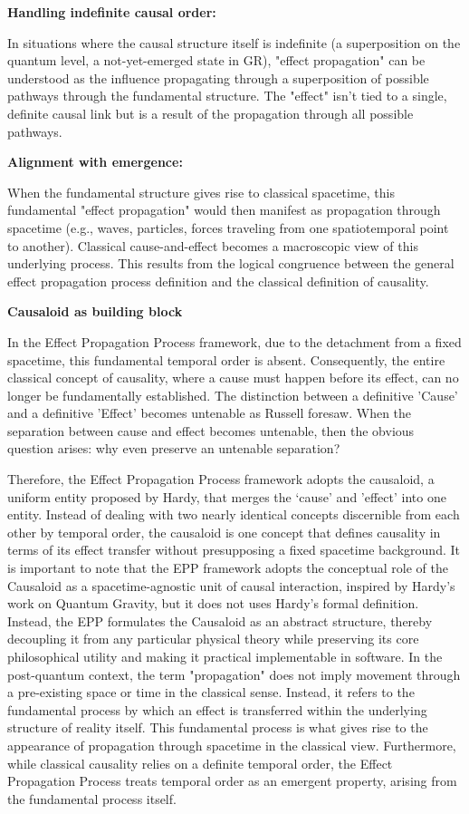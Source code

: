 \documentclass{article}
\begin{document}
\textbf{Handling indefinite causal order:}

In situations where the causal structure itself is indefinite (a superposition on the quantum level, a not-yet-emerged state in GR), "effect propagation" can be understood as the influence propagating through a superposition of possible pathways through the fundamental structure. The "effect" isn't tied to a single, definite causal link but is a result of the propagation through all possible pathways.

\textbf{Alignment with emergence:}

When the fundamental structure gives rise to classical spacetime, this fundamental "effect propagation" would then manifest as propagation through spacetime (e.g., waves, particles, forces traveling from one spatiotemporal point to another). Classical cause-and-effect becomes a macroscopic view of this underlying process. This results from the logical congruence between the general effect propagation process definition and the classical definition of causality.

\textbf{Causaloid as building block}

In the Effect Propagation Process framework, due to the detachment from a fixed spacetime, this fundamental temporal order is absent. Consequently, the entire classical concept of causality, where a cause must happen before its effect, can no longer be fundamentally established. The distinction between a definitive 'Cause' and a definitive 'Effect' becomes untenable as Russell foresaw. When the separation between cause and effect becomes untenable, then the obvious question arises: why even preserve an untenable separation?

Therefore, the Effect Propagation Process framework adopts the causaloid, a uniform entity proposed by Hardy\cite{HardyDynamicCausalStructure}, that merges the ‘cause' and 'effect' into one entity. Instead of dealing with two nearly identical concepts discernible from each other by temporal order, the causaloid is one concept that defines causality in terms of its effect transfer without presupposing a fixed spacetime background. It is important to note that the EPP framework adopts the conceptual role of the Causaloid as a spacetime-agnostic unit of causal interaction, inspired by Hardy’s work on Quantum Gravity, but it does not uses Hardy's formal definition. Instead, the EPP formulates the Causaloid as an abstract structure, thereby decoupling it from any particular physical theory while preserving its core philosophical utility and making it practical implementable in software.
\newline
In the post-quantum context, the term "propagation" does not imply movement through a pre-existing space or time in the classical sense. Instead, it refers to the fundamental process by which an effect is transferred within the underlying structure of reality itself. This fundamental process is what gives rise to the appearance of propagation through spacetime in the classical view. Furthermore, while classical causality relies on a definite temporal order, the Effect Propagation Process treats temporal order as an emergent property, arising from the fundamental process itself.
\end{document}

